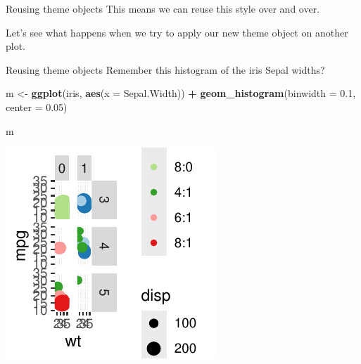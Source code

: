 \documentclass[
  ignorenonframetext,
]{beamer}
\newenvironment{Shaded}{\begin{snugshade}}{\end{snugshade}}
\newcommand{\AttributeTok}[1]{\textcolor[rgb]{0.13,0.29,0.53}{#1}}
\newcommand{\FloatTok}[1]{\textcolor[rgb]{0.00,0.00,0.81}{#1}}
\newcommand{\FunctionTok}[1]{\textcolor[rgb]{0.13,0.29,0.53}{\textbf{#1}}}
\newcommand{\NormalTok}[1]{#1}
\newcommand{\OtherTok}[1]{\textcolor[rgb]{0.56,0.35,0.01}{#1}}
\newcommand{\SpecialCharTok}[1]{\textcolor[rgb]{0.81,0.36,0.00}{\textbf{#1}}}
\begin{document}
\begin{frame}{Reusing theme objects}
\label{reusing-theme-objects-1}
This means we can reuse this style over and over.

Let's see what happens when we try to apply our new theme object on
another plot.
\end{frame}

\begin{frame}[fragile]{Reusing theme objects}
\label{reusing-theme-objects-2}
Remember this histogram of the iris Sepal widths?


\begin{Shaded}
\begin{Highlighting}[]
\NormalTok{m }\OtherTok{\textless{}{-}} \FunctionTok{ggplot}\NormalTok{(iris, }\FunctionTok{aes}\NormalTok{(}\AttributeTok{x =}\NormalTok{ Sepal.Width)) }\SpecialCharTok{+} \FunctionTok{geom\_histogram}\NormalTok{(}\AttributeTok{binwidth =} \FloatTok{0.1}\NormalTok{,}
    \AttributeTok{center =} \FloatTok{0.05}\NormalTok{)}

\NormalTok{m}
\end{Highlighting}
\end{Shaded}

\begin{center}\includegraphics[width=0.5\linewidth]{Figs/unnamed-chunk-78-1} \end{center}
\end{frame}
\end{document}
